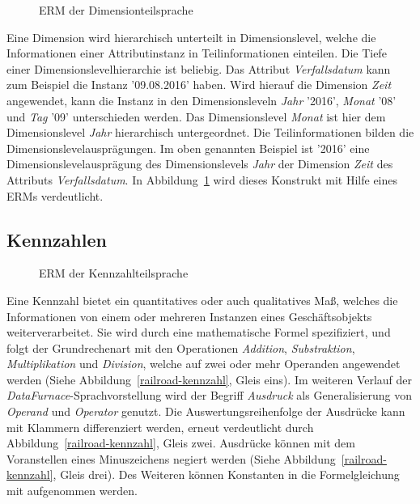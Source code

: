 \documentclass[
  language=german, %
  type=bachelor,%
  ngerman
]{isthesis}
\begin{document}
\begin{content}
  \begin{figure}
    \resizebox{350px}{!}{}
    \caption{\acrshort{ERM} der Dimensionteilsprache}\label{dimension-erm}
  \end{figure}

	Eine Dimension wird hierarchisch unterteilt in Dimensionslevel, welche die
	Informationen einer Attributinstanz in Teilinformationen einteilen. Die Tiefe
	einer Dimensionslevelhierarchie ist beliebig. Das Attribut
	\textit{Verfallsdatum} kann zum Beispiel die Instanz '09.08.2016' haben. Wird
	hierauf die Dimension \textit{Zeit} angewendet, kann die Instanz in den
	Dimensionsleveln \textit{Jahr} '2016', \textit{Monat} '08' und \textit{Tag}
	'09' unterschieden werden. Das Dimensionslevel \textit{Monat} ist hier dem
	Dimensionslevel \textit{Jahr} hierarchisch untergeordnet. Die
	Teilinformationen bilden die Dimensionslevelausprägungen. Im oben genannten
	Beispiel ist '2016' eine Dimensionslevelausprägung des Dimensionslevels
	\textit{Jahr} der Dimension \textit{Zeit} des Attributs
	\textit{Verfallsdatum}. In Abbildung~\ref{dimension-erm} wird dieses
	Konstrukt mit Hilfe eines \acrshort{ERM}s verdeutlicht.

  \subsection{Kennzahlen}

  \begin{figure}
    \resizebox{250px}{!}{}
    \caption{\acrshort{ERM} der Kennzahlteilsprache}\label{kennzahl}
  \end{figure}

	Eine Kennzahl bietet ein quantitatives oder auch qualitatives Maß, welches
	die Informationen von einem oder mehreren Instanzen eines Geschäftsobjekts
	weiterverarbeitet. Sie wird durch eine mathematische Formel spezifiziert, und
	folgt der Grundrechenart mit den Operationen \textit{Addition},
	\textit{Substraktion}, \textit{Multiplikation} und \textit{Division}, welche
	auf zwei oder mehr Operanden angewendet werden (Siehe
	Abbildung~\ref{railroad-kennzahl}, Gleis eins). Im weiteren Verlauf der
	\textit{DataFurnace}-Sprachvorstellung wird der Begriff \textit{Ausdruck} als
	Generalisierung von \textit{Operand} und \textit{Operator} genutzt.  Die
	Auswertungsreihenfolge der Ausdrücke kann mit Klammern differenziert werden,
	erneut verdeutlicht durch Abbildung~\ref{railroad-kennzahl}, Gleis zwei.
	Ausdrücke können mit dem Voranstellen eines Minuszeichens negiert werden
	(Siehe Abbildung~\ref{railroad-kennzahl}, Gleis drei). Des Weiteren können
	Konstanten in die Formelgleichung mit aufgenommen werden.


\end{content}
\end{document}
